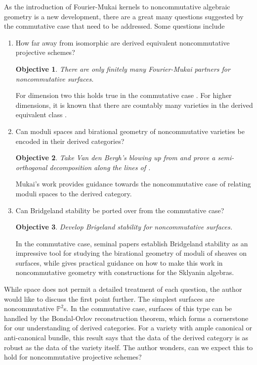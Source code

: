 \documentclass[11pt]{article}
\newtheorem{objective}{Objective}
\begin{document}
As the introduction of Fourier-Mukai kernels to noncommutative algebraic geometry is a new development, there are a great many questions suggested by the commutative case that need to be addressed.
Some questions include
\begin{enumerate}
\item
  How far away from isomorphic are derived equivalent noncommutative projective schemes?
  \begin{tcolorbox}
    \begin{objective}
      There are only finitely many Fourier-Mukai partners for noncommutative surfaces.
    \end{objective}
  \end{tcolorbox}
  For dimension two this holds true in the commutative case \cite[Sect. 12]{HuyFMT}.
  For higher dimensions, it is known that there are countably many varieties in the derived equivalent class \cite{AnToe}.
\item
  Can moduli spaces and birational geometry of noncommutative varieties be encoded in their derived categories?
  \begin{tcolorbox}
    \begin{objective}
      Take Van den Bergh's blowing up from \cite{van2001blowing} and prove a semi-orthogonal decomposition along the lines of \cite{Bondal-Orlov}.
    \end{objective}
  \end{tcolorbox}
  Mukai's work \cite{Mukai81,Mukai87} provides guidance towards the noncommutative case of relating moduli spaces to the derived category.
\item
  Can Bridgeland stability be ported over from the commutative case?
  \begin{tcolorbox}
    \begin{objective}
      Develop Brigeland stability for noncommutative surfaces.
    \end{objective}
  \end{tcolorbox}
  In the commutative case, seminal papers \cite{Bri07, ABCH13, BM14a, BM14b} establish Bridgeland stability as an impressive tool for studying the birational geometry of moduli of sheaves on surfaces, while \cite{LiZhMMP} gives practical guidance on how to make this work in noncommutative geometry with constructions for the Sklyanin algebras.
\end{enumerate}
While space does not permit a detailed treatment of each question, the author would like to discuss the first point further.
The simplest surfaces are noncommutative $\mathbb{P}^2$s.
In the commutative case, surfaces of this type can be handled by the Bondal-Orlov reconstruction theorem, which forms a cornerstone for our understanding of derived categories.
For a variety with ample canonical or anti-canonical bundle, this result says that the data of the derived category is as robust as the data of the variety itself.
The author wonders, can we expect this to hold for noncommutative projective schemes?
\end{document}

